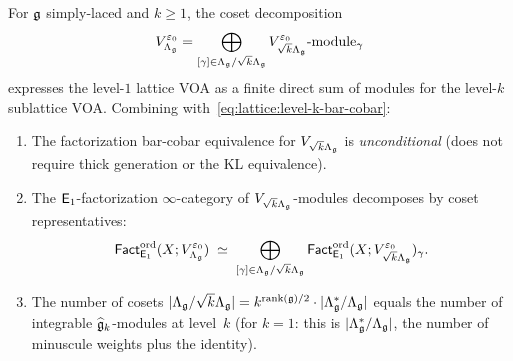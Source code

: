 \begin{theorem}
\label{thm:lattice:level-k-dk}
For $\mathfrak{g}$ simply-laced and $k \geq 1$, the coset decomposition
\begin{equation}\label{eq:lattice:coset-decomposition}
V_{\Lambda_{\mathfrak{g}}}^{\varepsilon_0}
= \bigoplus_{[\gamma] \in \Lambda_{\mathfrak{g}}/\sqrt{k}\Lambda_{\mathfrak{g}}}
  V_{\sqrt{k}\Lambda_{\mathfrak{g}}}^{\varepsilon_0}\text{-module}_\gamma
\end{equation}
expresses the level-$1$ lattice VOA as a finite direct sum of
modules for the level-$k$ sublattice VOA.  Combining
with~\eqref{eq:lattice:level-k-bar-cobar}:
\begin{enumerate}[label=(\roman*)]
\item The factorization bar-cobar equivalence for
  $V_{\sqrt{k}\Lambda_{\mathfrak{g}}}$ is \emph{unconditional}
  \textup{(}does not require thick generation or the KL
  equivalence\textup{)}.
\item The $\mathsf{E}_1$-factorization $\infty$-category of
  $V_{\sqrt{k}\Lambda_{\mathfrak{g}}}$-modules decomposes by coset
  representatives:
  \[
  \mathsf{Fact}_{\mathsf{E}_1}^{\mathrm{ord}}(X; V_{\Lambda_{\mathfrak{g}}}^{\varepsilon_0})
  \;\simeq\;
  \bigoplus_{[\gamma] \in \Lambda_{\mathfrak{g}}/\sqrt{k}\Lambda_{\mathfrak{g}}}
  \mathsf{Fact}_{\mathsf{E}_1}^{\mathrm{ord}}(X;
    V_{\sqrt{k}\Lambda_{\mathfrak{g}}}^{\varepsilon_0})_\gamma.
  \]
\item The number of cosets
  $|\Lambda_{\mathfrak{g}}/\sqrt{k}\Lambda_{\mathfrak{g}}| =
  k^{\operatorname{rank}(\mathfrak{g})/2} \cdot |\Lambda_{\mathfrak{g}}^*/\Lambda_{\mathfrak{g}}|$
  equals the number of integrable
  $\widehat{\mathfrak{g}}_k$-modules at level~$k$
  \textup{(}for $k = 1$: this is
  $|\Lambda_{\mathfrak{g}}^*/\Lambda_{\mathfrak{g}}|$, the number of minuscule weights
  plus the identity\textup{)}.
\end{enumerate}
\end{theorem}

